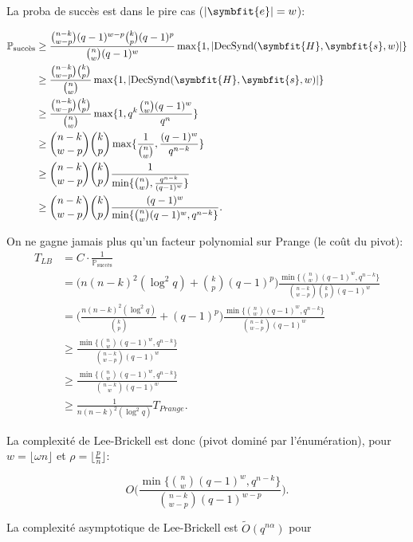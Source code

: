 \documentclass[a4paper,11pt,headings=small,footinclude=false]{scrartcl}
\theoremstyle{definition}
\theoremstyle{remark}
\begin{document}
La proba de succès est dans le pire cas ($|\symbfit{e}|=w$):

\begin{align*}
\mathbb{P}_{\text{succès}} &\geq  \frac{\binom{n-k}{w-p}(q-1)^{w-p} \binom{k}{p}(q-1)^{p}}{\binom{n}{w}(q-1)^w} \max \{ 1, |\text{DecSynd}(\symbfit{H},\symbfit{s},w)|\}\\
&\geq  \frac{\binom{n-k}{w-p} \binom{k}{p}}{\binom{n}{w}} \max \{ 1, |\text{DecSynd}(\symbfit{H},\symbfit{s},w)|\}\\
&\geq  \frac{\binom{n-k}{w-p} \binom{k}{p}}{\binom{n}{w}} \max \{ 1, q^k \frac{\binom{n}{w}(q-1)^w}{q^n}\}\\
&\geq  \binom{n-k}{w-p} \binom{k}{p} \max \{ \frac{1}{\binom{n}{w}}, \frac{(q-1)^w}{q^{n-k}}\}\\
&\geq  \binom{n-k}{w-p} \binom{k}{p} \frac{1}{\min \{ \binom{n}{w}, \frac{q^{n-k}}{(q-1)^w}\}}\\
&\geq  \binom{n-k}{w-p} \binom{k}{p} \frac{(q-1)^w}{\min \{ \binom{n}{w}(q-1)^w, q^{n-k}\}}.
\end{align*}

On ne gagne jamais plus qu'un facteur polynomial sur Prange (le coût du pivot):
\begin{align*}
T_{LB} &= C\cdot \frac{1}{\mathbb{P}_{\text{succès}}}\\
&=\Bigg(n(n-k)^2(\log^2 q) + \binom{k}{p}(q-1)^p\Bigg)  \frac{\min \{ \binom{n}{w}(q-1)^w, q^{n-k}\}}{\binom{n-k}{w-p} \binom{k}{p}(q-1)^w}\\
&=\Bigg(\frac{n(n-k)^2(\log^2 q)}{\binom{k}{p}} +(q-1)^p\Bigg)  \frac{\min \{ \binom{n}{w}(q-1)^w, q^{n-k}\}}{\binom{n-k}{w-p} (q-1)^w}\\
&\geq \frac{\min \{ \binom{n}{w}(q-1)^w, q^{n-k}\}}{\binom{n-k}{w-p} (q-1)^w}\\
&\geq \frac{\min \{ \binom{n}{w}(q-1)^w, q^{n-k}\}}{\binom{n-k}{w} (q-1)^w}\\
&\geq \frac{1}{n(n-k)^2(\log^2 q)} T_{Prange}.
\end{align*}

La complexité de Lee-Brickell est donc (pivot dominé par l'énumération), pour $w=\lfloor \omega n \rfloor$ et $\rho=\lfloor \frac{p}{n} \rfloor$:

\[
	O\Bigg(\frac{\min \{ \binom{n}{w}(q-1)^w, q^{n-k}\}}{\binom{n-k}{w-p} (q-1)^{w-p}}\Bigg).
\]

La complexité asymptotique de Lee-Brickell est $\tilde{O}(q^{n\alpha})$ pour
\end{document}

